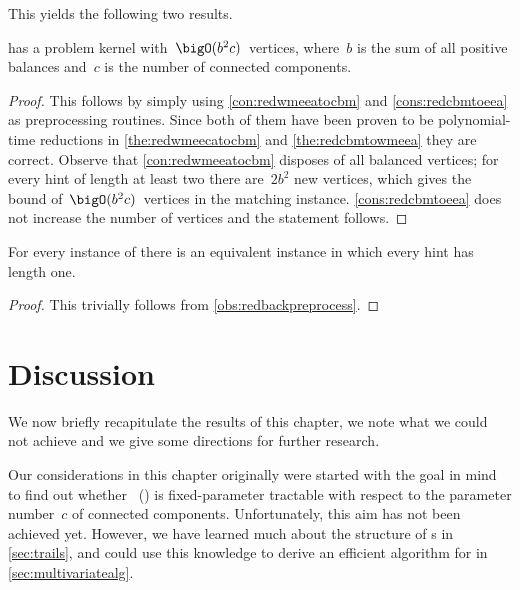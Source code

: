 This yields the following two results.
\begin{corollary}\label{cor:eecaprobkernel}
  \pWMEECAs{} has a problem kernel with~$\bigO(b^2c)$~vertices, where~$b$ is the sum of all positive balances and~$c$ is the number of connected components.
\end{corollary}
\begin{proof}
  This follows by simply using \autoref{con:redwmeeatocbm} and \autoref{cons:redcbmtoeea} as preprocessing routines. Since both of them have been proven to be polynomial-time reductions in \autoref{the:redwmeecatocbm} and \autoref{the:redcbmtowmeea} they are correct. Observe that \autoref{con:redwmeeatocbm} disposes of all balanced vertices; for every hint of length at least two there are~$2b^2$ new vertices, which gives the bound of~$\bigO(b^2c)$~vertices in the matching instance. \autoref{cons:redcbmtoeea} does not increase the number of vertices and the statement follows.
\end{proof}
\begin{corollary}
  For every instance of \pWMEECAs{} there is an equivalent instance in which every hint has length one.
\end{corollary}
\begin{proof}
  This trivially follows from \autoref{obs:redbackpreprocess}.
\end{proof}

\section{Discussion}
We now briefly recapitulate the results of this chapter, we note what we could not achieve and we give some directions for further research.

Our considerations in this chapter originally were started with the goal in mind to find out whether \pWMEE{}~(\pWMEEs{}) is fixed-parameter tractable with respect to the parameter number~$c$ of connected components.
Unfortunately, this aim has not been achieved yet. However, we have learned much about the structure of \EE s in \autoref{sec:trails}, and could use this knowledge to derive an efficient algorithm for \pWMEEs{} in \autoref{sec:multivariatealg}. 

